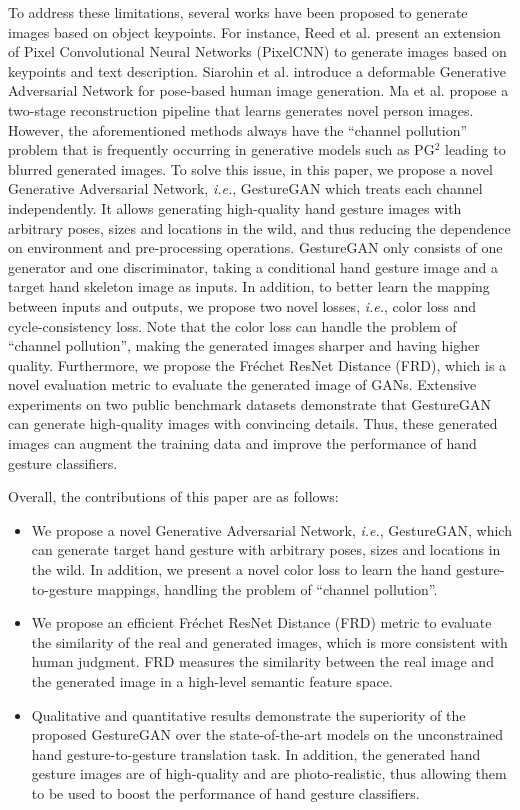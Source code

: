 \documentclass[sigconf]{acmart}
\begin{document}
To address these limitations, several works have been proposed to generate images based on object keypoints.
For instance, 
Reed et al. \cite{reed2016generating} present an extension of Pixel Convolutional Neural Networks (PixelCNN) to generate images based on keypoints and text description.
Siarohin et al. \cite{siarohin2017deformable} introduce a deformable Generative Adversarial Network for pose-based human image generation.
Ma et al. \cite{ma2017disentangled} propose a two-stage reconstruction pipeline that learns generates novel person images.
However, the aforementioned methods always have the ``channel pollution'' problem that is frequently occurring in generative models such as PG$^2$ \cite{ma2017pose} leading to blurred generated images.
To solve this issue, in this paper, we propose a novel Generative Adversarial Network, \textit{i.e.}, GestureGAN which treats each channel independently.
It allows generating high-quality hand gesture images with arbitrary poses, sizes and locations in the wild, and thus reducing the dependence on environment and pre-processing operations. 
GestureGAN only consists of one generator and one discriminator, taking  a conditional hand gesture image and a target hand skeleton image as inputs.
In addition, to better learn the mapping between inputs and outputs, we propose two novel losses, \textit{i.e.}, color loss and cycle-consistency loss.
Note that the color loss can handle the problem of ``channel pollution'', 
making the generated images sharper and having higher quality.
Furthermore, we propose the Fr\'echet ResNet Distance (FRD), which is a novel evaluation metric to evaluate the generated image of GANs.
Extensive experiments on two public benchmark datasets demonstrate that GestureGAN can generate high-quality images with convincing details. 
Thus, these generated images can augment the training data and improve the performance of  hand gesture classifiers.

Overall, the contributions of this paper are as follows:
\begin{itemize}[leftmargin=*]
	\item We propose a novel Generative Adversarial Network, \textit{i.e.}, GestureGAN,  which can generate target hand gesture with arbitrary poses, sizes and locations in the wild. In addition, we present a novel color loss to learn the hand gesture-to-gesture mappings, handling the problem of ``channel pollution''.
	\item We propose an efficient Fr\'echet ResNet Distance (FRD) metric to evaluate the similarity of the real and generated images, which is more consistent with human judgment.
	FRD measures the similarity between the real image and the generated image in a high-level semantic feature space.
	\item  Qualitative and quantitative results demonstrate the superiority of the proposed GestureGAN over the state-of-the-art models on the unconstrained hand gesture-to-gesture translation task. In addition, the generated hand gesture images are of high-quality and are photo-realistic, thus allowing them to be used to boost the performance of hand gesture classifiers.
\end{itemize}
\end{document}
